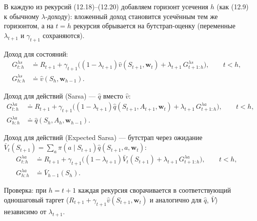 \begin{solution}
    В каждую из рекурсий (12.18)--(12.20) добавляем горизонт усечения $h$ (как
    (12.9) к обычному $\lambda$-доходу): вложенный доход становится усечённым тем
    же горизонтом, а на $t=h$ рекурсия обрывается на бутстрап-оценку (переменные
    $\lambda_{t+1}$ и $\gamma_{t+1}$ сохраняются).

    Доход для состояний:
    \begin{align*}
        G_{t:h}^{\lambda s} &\doteq R_{t+1} + \gamma_{t+1}\Big((1-\lambda_{t+1})\hat v(S_{t+1},\mathbf w_t) + \lambda_{t+1}\,G_{t+1:h}^{\lambda s}\Big), \qquad t<h,\\
        G_{h:h}^{\lambda s} &\doteq \hat v(S_h,\mathbf w_{h-1}).
    \end{align*}

    Доход для действий (Sarsa) --- $\hat q$ вместо $\hat v$:
    \begin{align*}
        G_{t:h}^{\lambda a} &\doteq R_{t+1} + \gamma_{t+1}\Big((1-\lambda_{t+1})\hat q(S_{t+1},A_{t+1},\mathbf w_t) + \lambda_{t+1}\,G_{t+1:h}^{\lambda a}\Big), \qquad t<h,\\
        G_{h:h}^{\lambda a} &\doteq \hat q(S_h,A_h,\mathbf w_{h-1}).
    \end{align*}

    Доход для действий (Expected Sarsa) --- бутстрап через ожидание $\bar V_t(S_{t+1})=\sum_a \pi(a\mid S_{t+1})\hat q(S_{t+1},a,\mathbf w_t)$:
    \begin{align*}
        G_{t:h}^{\lambda a} &\doteq R_{t+1} + \gamma_{t+1}\Big((1-\lambda_{t+1})\bar V_t(S_{t+1}) + \lambda_{t+1}\,G_{t+1:h}^{\lambda a}\Big), \qquad t<h,\\
        G_{h:h}^{\lambda a} &\doteq \bar V_{h-1}(S_h).
    \end{align*}

    Проверка: при $h=t+1$ каждая рекурсия сворачивается в соответствующий
    одношаговый таргет ($R_{t+1}+\gamma_{t+1}\hat v(S_{t+1},\mathbf w_t)$ и
    аналогично для $\hat q$, $\bar V$) независимо от $\lambda_{t+1}$.
\end{solution}

